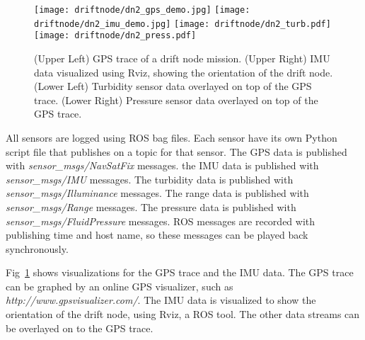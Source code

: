 \begin{figure}[h]
	\begin{center}
	\texttt{[image: driftnode/dn2\_gps\_demo.jpg]}
	\texttt{[image: driftnode/dn2\_imu\_demo.jpg]}
	\texttt{[image: driftnode/dn2\_turb.pdf]}
	\texttt{[image: driftnode/dn2\_press.pdf]}
	\caption[Driftnode]{
		(Upper Left) GPS trace of a drift node mission.
		(Upper Right) IMU data visualized using Rviz, showing the orientation of the drift node.
		(Lower Left) Turbidity sensor data overlayed on top of the GPS trace.
		(Lower Right) Pressure sensor data overlayed on top of the GPS trace.
	} \label{fig:driftvis}
	\end{center}
	\vspace{-1em}
\end{figure}

All sensors are logged using ROS bag files.
Each sensor have its own Python script file that publishes on a topic for that sensor.
The GPS data is published with \textit{sensor\_msgs/NavSatFix} messages.
the IMU data is published with \textit{sensor\_msgs/IMU} messages.
The turbidity data is published with \textit{sensor\_msgs/Illuminance} messages.
The range data is published with \textit{sensor\_msgs/Range} messages.
The pressure data is published with \textit{sensor\_msgs/FluidPressure} messages.
ROS messages are recorded with publishing time and host name, so these messages can be played back synchronously.


Fig~\ref{fig:driftvis} shows visualizations for the GPS trace and the IMU data.
The GPS trace can be graphed by an online GPS visualizer, such as \emph{http://www.gpsvisualizer.com/}.
The IMU data is visualized to show the orientation of the drift node, using Rviz, a ROS tool.
The other data streams can be overlayed on to the GPS trace.
